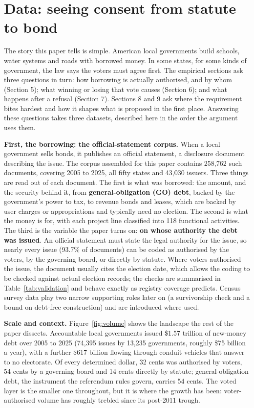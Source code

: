 \section{Data: seeing consent from statute to bond}
The story this paper tells is simple. American local governments build schools, water systems and roads with borrowed money. In some states, for some kinds of government, the law says the voters must agree first. The empirical sections ask three questions in turn: how borrowing is actually authorised, and by whom (Section 5); what winning or losing that vote causes (Section 6); and what happens after a refusal (Section 7). Sections 8 and 9 ask where the requirement bites hardest and how it shapes what is proposed in the first place. Answering these questions takes three datasets, described here in the order the argument uses them.

\textbf{First, the borrowing: the official-statement corpus.} When a local government sells bonds, it publishes an official statement, a disclosure document describing the issue. The corpus assembled for this paper contains 258,762 such documents, covering 2005 to 2025, all fifty states and 43,030 issuers. Three things are read out of each document. The first is what was borrowed: the amount, and the security behind it, from \textbf{general-obligation (GO) debt}, backed by the government's power to tax, to revenue bonds and leases, which are backed by user charges or appropriations and typically need no election. The second is what the money is for, with each project line classified into 118 functional activities. The third is the variable the paper turns on: \textbf{on whose authority the debt was issued}. An official statement must state the legal authority for the issue, so nearly every issue (93.7\% of documents) can be coded as authorised by the voters, by the governing board, or directly by statute. Where voters authorised the issue, the document usually cites the election date, which allows the coding to be checked against actual election records; the checks are summarised in Table~\ref{tab:validation} and behave exactly as registry coverage predicts. Census survey data play two narrow supporting roles later on (a survivorship check and a bound on debt-free construction) and are introduced where used.

\textbf{Scale and context.} Figure~\ref{fig:volume} shows the landscape the rest of the paper dissects. Accountable local governments issued \$1.57 trillion of new-money debt over 2005 to 2025 (74,395 issues by 13,235 governments, roughly \$75 billion a year), with a further \$617 billion flowing through conduit vehicles that answer to no electorate. Of every determined dollar, 32 cents was authorised by voters, 54 cents by a governing board and 14 cents directly by statute; general-obligation debt, the instrument the referendum rules govern, carries 54 cents. The voted layer is the smaller one throughout, but it is where the growth has been: voter-authorised volume has roughly trebled since its post-2011 trough.

